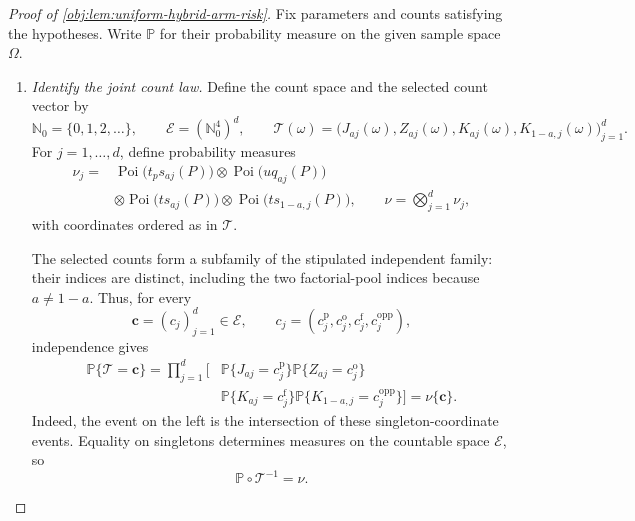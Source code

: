 \documentclass[11pt]{article}
\begin{document}
\begin{proof}[Proof of \cref{obj:lem:uniform-hybrid-arm-risk}]
Fix parameters and counts satisfying the hypotheses. Write \(\mathbb P\) for their probability measure on the given sample space \(\Omega\).

\begin{enumerate}
\item \textit{Identify the joint count law.}
Define the count space and the selected count vector by
\[
\mathbb N_0=\{0,1,2,\ldots\},\qquad
\mathcal E=(\mathbb N_0^4)^d,\qquad
\mathscr T(\omega)
=
\bigl(J_{aj}(\omega),Z_{aj}(\omega),
K_{aj}(\omega),K_{1-a,j}(\omega)\bigr)_{j=1}^d.
\]
For \(j=1,\ldots,d\), define probability measures
\[
\begin{aligned}
\nu_j={}&
\operatorname{Poi}\!\bigl(t_ps_{aj}(P)\bigr)
\otimes\operatorname{Poi}\!\bigl(uq_{aj}(P)\bigr)\\
&\otimes\operatorname{Poi}\!\bigl(ts_{aj}(P)\bigr)
\otimes\operatorname{Poi}\!\bigl(ts_{1-a,j}(P)\bigr),
\qquad
\nu=\bigotimes_{j=1}^d\nu_j,
\end{aligned}
\]
with coordinates ordered as in \(\mathscr T\).

The selected counts form a subfamily of the stipulated independent family: their indices are distinct, including the two factorial-pool indices because \(a\ne1-a\). Thus, for every
\[
\boldsymbol c=(c_j)_{j=1}^d\in\mathcal E,
\qquad
c_j=(c_j^{\mathrm p},c_j^{\mathrm o},
c_j^{\mathrm f},c_j^{\mathrm{opp}}),
\]
independence gives
\[
\begin{aligned}
\mathbb P\{\mathscr T=\boldsymbol c\}
=\prod_{j=1}^d\bigl[
&\mathbb P\{J_{aj}=c_j^{\mathrm p}\}
\mathbb P\{Z_{aj}=c_j^{\mathrm o}\}\\
&\mathbb P\{K_{aj}=c_j^{\mathrm f}\}
\mathbb P\{K_{1-a,j}=c_j^{\mathrm{opp}}\}
\bigr]
=\nu\{\boldsymbol c\}.
\end{aligned}
\]
Indeed, the event on the left is the intersection of these singleton-coordinate events. Equality on singletons determines measures on the countable space \(\mathcal E\), so
\[
\mathbb P\circ\mathscr T^{-1}=\nu.
\]


\end{enumerate}
\end{proof}
\end{document}
